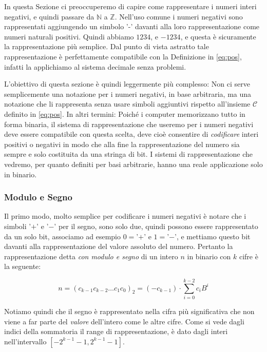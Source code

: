 In questa Sezione ci preoccuperemo di capire come rappresentare i numeri interi negativi, e quindi passare da $\mathbb{N}$ a $\mathbb{Z}$. Nell'uso comune i numeri negativi sono rappresentati aggiungendo un simbolo '-' davanti alla loro rappresentazione come numeri naturali positivi. Quindi abbiamo $1234$, e $-1234$, e questa è sicuramente la rappresentazione più semplice. Dal punto di vista astratto tale rappresentazione è perfettamente compatibile con la Definizione in \eqref{eq:pos}, infatti la applichiamo al sistema decimale senza problemi.

L'obiettivo di questa sezione è quindi leggermente più complesso: Non ci serve semplicemente una notazione per i numeri negativi, in base arbitraria, ma una notazione che li rappresenta senza usare simboli aggiuntivi rispetto all'insieme $\mathcal{C}$ definito in \eqref{eq:pos}. In altri termini: Poiché i computer memorizzano tutto in forma binaria, il sistema di rappresentazione che useremo per i numeri negativi deve essere compatibile con questa scelta, deve cioè consentire di \emph{codificare} interi positivi o negativi in modo che alla fine la rappresentazione del numero sia sempre e solo costituita da una stringa di bit. I sistemi di rappresentazione che vedremo, per quanto
definiti per basi arbitrarie, hanno una reale applicazione solo in binario.

\subsubsection{Modulo e Segno}

Il primo modo, molto semplice per codificare i numeri negativi è notare che i simboli '$+$' e '$-$' per il segno, sono solo due, quindi possono essere rappresentato da un solo bit, associamo ad esempio $0 = $'$+$' e $1 = $'$-$', e mettiamo questo bit davanti alla rappresentazione del valore assoluto del numero. Pertanto la rappresentazione detta \emph{con modulo e segno} di un intero $n$ in binario con $k$ cifre è la seguente:

\[ n = (c_{k-1}c_{k-2}{\ldots}c_1c_0)_2 = (-c_{k-1}) \cdot \sum_{i=0}^{k-2}c_iB^i \]

Notiamo quindi che il segno è rappresentato nella cifra più significativa che  non viene a far parte del \emph{valore} dell'intero come le altre cifre. Come si vede dagli indici della sommatoria il range di rappresentazione, è dato dagli interi nell'intervallo $[-2^{k-1}-1,2^{k-1}-1]$.

